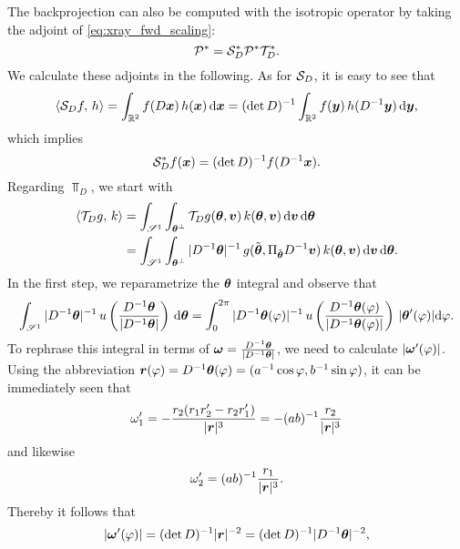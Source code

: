\documentclass{amsart}
\newcommand*{\Dinv}{{\ensuremath{D^{-1}}}}
\renewcommand*{\phi}{\varphi}
\begin{document}
The backprojection can also be computed with the isotropic operator by taking the adjoint of \eqref{eq:xray_fwd_scaling}:
%
\begin{equation}
 \label{eq:xray_backproj_scaling}
 {\ensuremath{\mathcal{P}}}^* = {\mathcal{S}}_D^* {\mathcal{P}}^* {\mathcal{T}}_D^*.
\end{equation} 
%
We calculate these adjoints in the following. As for ${\mathcal{S}}_D$, it is easy to see that
%
\begin{equation*}
 \spr{\Sop_D f}{h} = \int_{\RR^2} f(D\Bx)\, h(\Bx)\, \diff\Bx = (\det D)^{-1} \int_{\RR^2} f(\By)\, h(\Dinv\By)\, \diff\By, 
\end{equation*}
%
which implies
%
\begin{equation}
 \label{eq:vol_scaling_adjoint}
 \Sop_D^* f(\Bx) = (\det D)^{-1} f(\Dinv\Bx).
\end{equation}
%
Regarding $\Top_D$, we start with
%
\begin{align}
 \spr{\Top_D g}{k} 
 &= \int_{\Sphere^1} \int_{\Btheta^\perp} \Top_D g(\Btheta, \Bv)\, k(\Btheta, \Bv)\, \diff\Bv\, \diff\Btheta \notag \\
 \label{eq:proj_scaling_adjoint_step1}
 &= \int_{\Sphere^1} \int_{\Btheta^\perp} \abs{\Dinv \Btheta}^{-1}\, g(\tilde\Btheta, \Pi_{\tilde\Btheta} \Dinv\Bv)\, 
 k(\Btheta, \Bv)\, \diff\Bv\, \diff\Btheta.
\end{align}
%
In the first step, we reparametrize the ${\boldsymbol{\theta}}$ integral and observe that
%
\begin{equation}
 \label{eq:spherint_reparam_step1}
 \int_{\Sphere^1} \abs{\Dinv \Btheta}^{-1}\, u\left(\frac{\Dinv\Btheta}{\abs{\Dinv\Btheta}}\right)\, \diff \Btheta = 
 \int_0^{2\pi} \abs{\Dinv \Btheta(\phi)}^{-1}\, u\left(\frac{\Dinv\Btheta(\phi)}{\abs{\Dinv\Btheta(\phi)}}\right)\, \abs{\Btheta'(\phi)} 
 \diff\phi. 
\end{equation}
%
To rephrase this integral in terms of $\Bomega = \frac{\Dinv\Btheta}{\abs{\Dinv\Btheta}}$, we need to calculate $\abs{\Bomega'(\phi)}$. 
Using the abbreviation $\Br(\phi) = \Dinv\Btheta(\phi) = (a^{-1}\cos\phi, b^{-1}\sin\phi)$, it can be immediately seen that
%
\begin{equation*}
 \omega_1' = - \frac{r_2 (r_1 r_2' - r_2 r_1')}{|{\boldsymbol{r}}|^3} = -(ab)^{-1} \frac{r_2}{|{\boldsymbol{r}}|^3}
\end{equation*}
%
and likewise
%
\begin{equation*}
 \omega_2' = (ab)^{-1} \frac{r_1}{|{\boldsymbol{r}}|^3}.
\end{equation*}
%
Thereby it follows that 
%
\begin{equation*}
 \abs{\Bomega'(\phi)} = (\det D)^{-1} \abs{\Br}^{-2} = (\det D)^{-1} \abs{\Dinv \Btheta}^{-2},
\end{equation*}
\end{document}
